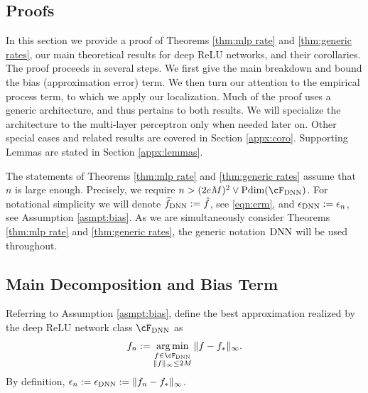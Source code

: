 \documentclass[11pt]{article}
\numberwithin{equation}{section}
\theoremstyle{definition}
\DeclareMathOperator*{\argmin}{arg\,min}
\def\argmin{\operatornamewithlimits{arg\,min}}
\newcommand{\deq}{:=}
\begin{document}
\onehalfspacing
\begin{appendices}




\section{Proofs}
	\label{appx:proof}


In this section we provide a proof of Theorems \ref{thm:mlp rate} and \ref{thm:generic rates}, our main theoretical results for deep ReLU networks, and their corollaries. The proof proceeds in several steps. We first give the main breakdown and bound the bias (approximation error) term. We then turn our attention to the empirical process term, to which we apply our localization. Much of the proof uses a generic architecture, and thus pertains to both results. We will specialize the architecture to the multi-layer perceptron only when needed later on. Other special cases and related results are covered in Section \ref{appx:coro}. Supporting Lemmas are stated in Section \ref{appx:lemmas}. 

The statements of Theorems \ref{thm:mlp rate} and \ref{thm:generic rates} assume that $n$ is large enough. Precisely, we require $n > (2eM)^2  \vee {\rm Pdim}(\cF_{\rm DNN})$. For notational simplicity we will denote $\widehat{f}_{\rm DNN} \deq \hat{f}$, see \eqref{eqn:erm}, and $\epsilon_{\rm DNN} \deq \epsilon_n$, see Assumption \ref{asmpt:bias}. As we are simultaneously consider Theorems \ref{thm:mlp rate} and \ref{thm:generic rates}, the generic notation ${\rm DNN}$ will be used throughout. 



\subsection{Main Decomposition and Bias Term}
	\label{appx:main-steps}
	
	Referring to Assumption \ref{asmpt:bias}, define the best approximation realized by the deep ReLU network class $\cF_{\rm DNN}$ as 
	\[
		f_n \deq \argmin_{\substack{f \in \cF_{\rm DNN} \\ \| f \|_\infty \leq 2M}} \| f - f_* \|_{\infty}.
	\]
	By definition, $\epsilon_n \deq \epsilon_{\rm DNN} \deq \| f_n - f_* \|_\infty$. 
	

\end{appendices}
\end{document}
